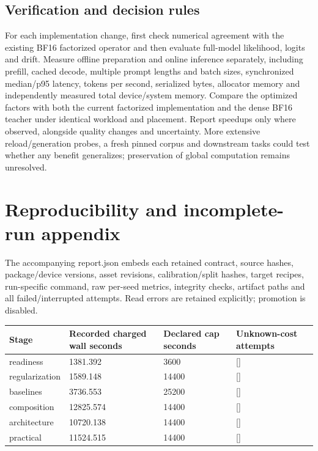 \documentclass[10pt]{article}
\begin{document}
\subsection{Verification and decision rules}

For each implementation change, first check numerical agreement with the existing BF16 factorized operator and then evaluate full-model likelihood, logits and drift. Measure offline preparation and online inference separately, including prefill, cached decode, multiple prompt lengths and batch sizes, synchronized median/p95 latency, tokens per second, serialized bytes, allocator memory and independently measured total device/system memory. Compare the optimized factors with both the current factorized implementation and the dense BF16 teacher under identical workload and placement. Report speedups only where observed, alongside quality changes and uncertainty. More extensive reload/generation probes, a fresh pinned corpus and downstream tasks could test whether any benefit generalizes; preservation of global computation remains unresolved.

\section{Reproducibility and incomplete-run appendix}

The accompanying report.json embeds each retained contract, source hashes, package/device versions, asset revisions, calibration/split hashes, target recipes, run-specific command, raw per-seed metrics, integrity checks, artifact paths and all failed/interrupted attempts. Read errors are retained explicitly; promotion is disabled.

{\scriptsize\setlength{\tabcolsep}{2pt}
\begin{longtable}{p{}p{}p{}p{}}
Stage & Recorded charged wall seconds & Declared cap seconds & Unknown-cost attempts \\
\hline\endhead
readiness & 1381.392 & 3600 & [] \\
regularization & 1589.148 & 14400 & [] \\
baselines & 3736.553 & 25200 & [] \\
composition & 12825.574 & 14400 & [] \\
architecture & 10720.138 & 14400 & [] \\
practical & 11524.515 & 14400 & [] \\
\end{longtable}}
\end{document}
